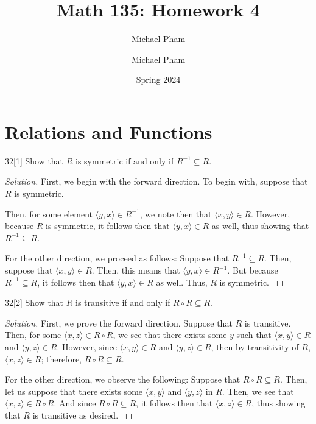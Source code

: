 \documentclass{article}
\title{#1}
\author{Michael Pham}
\date{#2}
\newenvironment{solution}{\begin{proof}[Solution]}{\end{proof}}
\renewcommand\qedsymbol{$\blacksquare$}
\newenvironment{innerproof}{\renewcommand{\qedsymbol}{$\square$}\proof}{\endproof}
\newcommand{\ang}[1]{\langle {#1} \rangle}
\newcommand{\mytitle}[2]{%
	\title{#1}
	\author{Michael Pham}
	\date{#2}
	\maketitle
	\newpage
	\listoftheorems
	\newpage
}
\begin{document}
	\mytitle{Math 135: Homework 4}{Spring 2024}
	
	\setcounter{section}{2}
	\section{Relations and Functions}
	\begin{hw}{32}[1]
		Show that $R$ is symmetric if and only if $R^{-1} \subseteq R$.
	\end{hw}
	\begin{solution}
		First, we begin with the forward direction.
		\begin{innerproof}
			To begin with, suppose that $R$ is symmetric.
			
			Then, for some element $\ang{y,x} \in R^{-1}$, we note then that $\ang{x,y} \in R$. However, because $R$ is symmetric, it follows then that $\ang{y,x} \in R$ as well, thus showing that $R^{-1} \subseteq R$.
		\end{innerproof}
	
		For the other direction, we proceed as follows:
		\begin{innerproof}
			Suppose that $R^{-1} \subseteq R$. Then, suppose that $\ang{x,y} \in R$. Then, this means that $\ang{y,x} \in R^{-1}$. But because $R^{-1} \subseteq R$, it follows then that $\ang{y,x} \in R$ as well. Thus, $R$ is symmetric.
		\end{innerproof}
	\end{solution}

	\begin{hw}{32}[2]
		Show that $R$ is transitive if and only if $R \circ R \subseteq R$.
	\end{hw}
	\begin{solution}
		First, we prove the forward direction.
		\begin{innerproof}
			Suppose that $R$ is transitive. Then, for some $\ang{x,z} \in R \circ R$, we see that there exists some $y$ such that $\ang{x,y} \in R$ and $\ang{y,z} \in R$. However, since $\ang{x,y} \in R$ and $\ang{y,z} \in R$, then by transitivity of $R$, $\ang{x,z} \in R$; therefore, $R \circ R \subseteq R$.
		\end{innerproof}
	
		For the other direction, we observe the following:
		\begin{innerproof}
			Suppose that $R \circ R \subseteq R$. Then, let us suppose that there exists some $\ang{x,y}$ and $\ang{y,z}$ in $R$. Then, we see that $\ang{x,z} \in R \circ R$. And since $R \circ R \subseteq R$, it follows then that $\ang{x,z} \in R$, thus showing that $R$ is transitive as desired.
		\end{innerproof}
	\end{solution}
\end{document}
